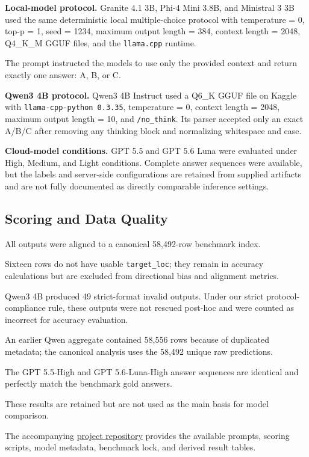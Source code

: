 \documentclass[10pt,a4paper,twocolumn]{article}
\begin{document}
\textbf{Local-model protocol.}
Granite 4.1 3B, Phi-4 Mini 3.8B, and Ministral 3 3B used the same
deterministic local multiple-choice protocol with temperature = 0,
top-p = 1, seed = 1234, maximum output length = 384,
context length = 2048, Q4\_K\_M GGUF files, and the
\texttt{llama.cpp} runtime.

The prompt instructed the models to use only the provided context and return
exactly one answer: A, B, or C.

\textbf{Qwen3 4B protocol.}
Qwen3 4B Instruct used a Q6\_K GGUF file on Kaggle with
\texttt{llama-cpp-python 0.3.35}, temperature = 0,
context length = 2048, maximum output length = 10, and
\texttt{/no\_think}. Its parser accepted only an exact A/B/C after removing
any thinking block and normalizing whitespace and case.

\textbf{Cloud-model conditions.}
GPT 5.5 and GPT 5.6 Luna were evaluated under High, Medium, and Light
conditions. Complete answer sequences were available, but the labels and
server-side configurations are retained from supplied artifacts and are not
fully documented as directly comparable inference settings.

\subsection{Scoring and Data Quality}

All outputs were aligned to a canonical 58,492-row benchmark index.

Sixteen rows do not have usable \texttt{target\_loc}; they remain in accuracy
calculations but are excluded from directional bias and alignment metrics.

Qwen3 4B produced 49 strict-format invalid outputs. Under our strict
protocol-compliance rule, these outputs were not rescued post-hoc and were
counted as incorrect for accuracy evaluation.

An earlier Qwen aggregate contained 58,556 rows because of duplicated metadata;
the canonical analysis uses the 58,492 unique raw predictions.

The GPT 5.5-High and GPT 5.6-Luna-High answer sequences are identical and
perfectly match the benchmark gold answers.

These results are retained but are not used as the main basis for model
comparison.

The accompanying
\href{https://github.com/pminhtaiii/LLM-Bias-Research/}{project repository}
provides the available prompts, scoring scripts, model metadata, benchmark
lock, and derived result tables.
\end{document}
